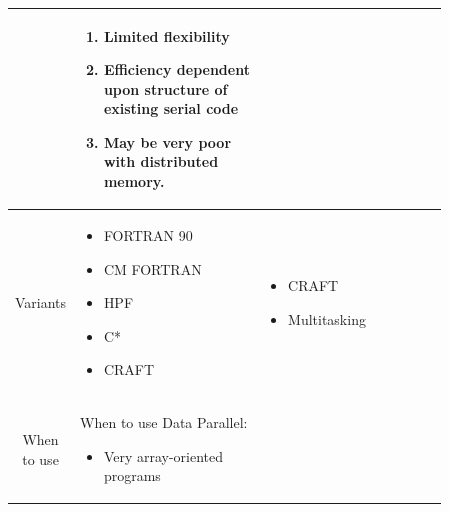 \documentclass[12pt, a4paper]{book}
\begin{document}
\begin{longtable}{|c|p{0.43\linewidth}|p{0.43\linewidth}|}
\begin{enumerate}
                    \end{enumerate}                                                                      & \begin{enumerate}
                                                                                                               \item Limited flexibility
                                                                                                               \item Efficiency dependent upon structure of existing serial code
                                                                                                               \item May be very poor with distributed memory.
                                                                                                           \end{enumerate}                                                        \\
    \hline
    Variants      & \begin{itemize}
                        \item FORTRAN 90
                        \item CM FORTRAN
                        \item HPF
                        \item   C*
                        \item CRAFT
                    \end{itemize}                                                                                       & \begin{itemize}
                                                                                                                              \item CRAFT
                                                                                                                              \item Multitasking
                                                                                                                          \end{itemize}                                                                                        \\
    \hline
    When to use   & When to use Data Parallel: \begin{itemize}
                                                   \item Very array-oriented programs

\end{itemize}
\end{longtable}
\end{document}
